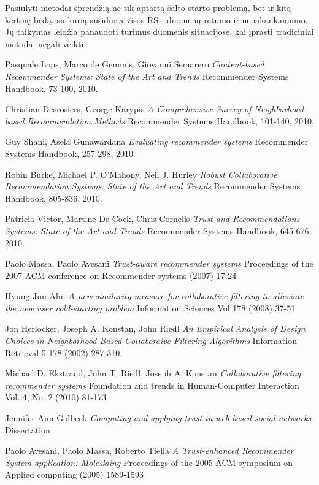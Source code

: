 \documentclass{VUMIFInfMagistrinis}
\begin{document}
\newline
\indent
Pasiūlyti metodai sprendžią ne tik aptartą šalto starto problemą, bet ir kitą kertinę bėdą, su kurią susiduria visos RS - duomenų retumo ir nepakankamumo. Jų taikymas leidžia panaudoti turimus duomenis situacijose, kai įprasti tradiciniai metodai negali veikti.

\begin{thebibliography}{9}
Pasquale Lops, Marco de Gemmis, Giovanni Semarero
\textit{Content-based Recommender Systems: State of the Art and Trends}
Recommender Systems Handbook, 73-100, 2010.
	
Christian Desrosiers, George Karypis
\textit{A Comprehensive Survey of Neighborhood-based Recommendation Methods}
Recommender Systems Handbook, 101-140, 2010.

Guy Shani, Asela Gunawardana
\textit{Evaluating recommender systems}
Recommender Systems Handbook, 257-298, 2010.
	
Robin Burke, Michael P. O'Mahony, Neil J. Hurley
\textit{Robust Collaborative Recommendation Systems: State of the Art and Trends}
Recommender Systems Handbook, 805-836, 2010.	
		
Patricia Victor, Martine De Cock, Chris Cornelis
\textit{Trust and Recommendations Systems: State of the Art and Trends}
Recommender Systems Handbook, 645-676, 2010.
	
Paolo Massa, Paolo Avesani
\textit{Trust-aware recommender systems}
Proceedings of the 2007 ACM conference on Recommender systems (2007) 17-24
	
Hyung Jun Ahn
\textit{A new similarity measure for collaborative filtering to alleviate the new user cold-starting problem}
Information Sciences Vol 178 (2008) 37-51
	
Jon Herlocker, Joseph A. Konstan, John Riedl
\textit{An Empirical Analysis of Design Choices in Neighborhood-Based Collaboraive Filtering Algorithms}
Information Retrieval 5 178 (2002) 287-310
	
Michael D. Ekstrand, John T. Riedl, Joseph A. Konstan
\textit{Collaborative filtering recommender systems}
Foundation and trends in Human-Computer Interaction Vol. 4, No. 2 (2010) 81-173

Jennifer Ann Golbeck
\textit{Computing and applying trust in web-based social networks}
Dissertation
	
Paolo Avesani, Paolo Massa, Roberto Tiella
\textit{A Trust-enhanced Recommender System application: Moleskiing}
Proceedings of the 2005 ACM symposium on Applied computing (2005) 1589-1593 
	

\end{thebibliography}
\end{document}
